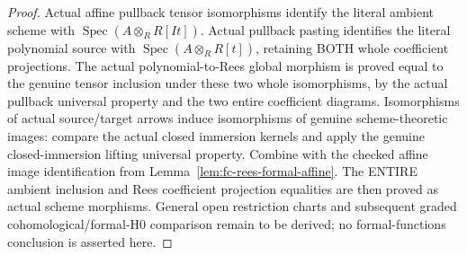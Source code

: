 \begin{proof}
Actual affine pullback tensor isomorphisms identify the literal ambient scheme with
$\operatorname{Spec}(A\otimes_R R[It])$. Actual pullback pasting identifies the literal polynomial
source with $\operatorname{Spec}(A\otimes_R R[t])$, retaining BOTH whole coefficient projections.
The actual polynomial-to-Rees global morphism is proved equal to the genuine tensor inclusion
under these two whole isomorphisms, by the actual pullback universal property and the two
entire coefficient diagrams. Isomorphisms of actual source/target arrows induce isomorphisms
of genuine scheme-theoretic images: compare the actual closed immersion kernels and apply
the genuine closed-immersion lifting universal property. Combine with the checked affine
image identification from Lemma~\ref{lem:fc-rees-formal-affine}. The ENTIRE ambient inclusion
and Rees coefficient projection equalities are then proved as actual scheme morphisms.
General open restriction charts and subsequent graded cohomological/formal-H0 comparison
remain to be derived; no formal-functions conclusion is asserted here.
\end{proof}

